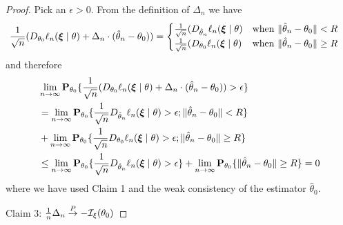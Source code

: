 \begin{proof}
Pick an $\epsilon > 0$.  From the definition of $\Delta_n$ we have
\begin{align*}
 \frac{1}{\sqrt{n}} (D_{\theta_0} \ell_n(\sample{\xi}
\mid \theta) + \Delta_n \cdot (\hat{\theta}_n - \theta_0))
&= \begin{cases}
 \frac{1}{\sqrt{n}} (D_{\hat{\theta}_n} \ell_n(\sample{\xi}
\mid \theta) & \text{when $\norm{\hat{\theta}_n -
  \theta_0} < R$} \\
 \frac{1}{\sqrt{n}} (D_{{\theta}_0} \ell_n(\sample{\xi}
\mid \theta) & \text{when $\norm{\hat{\theta}_n -
  \theta_0} \geq R$} \\
\end{cases}
\end{align*}
and therefore
\begin{align*}
&\lim_{n \to \infty} \sprobability{ \frac{1}{\sqrt{n}} (D_{\theta_0} \ell_n(\sample{\xi}
\mid \theta) + \Delta_n \cdot (\hat{\theta}_n - \theta_0)) >
\epsilon}{\theta_0} \\
&= 
\lim_{n \to \infty} \sprobability{  \frac{1}{\sqrt{n}} D_{\hat{\theta}_n} \ell_n(\sample{\xi}
\mid \theta) > \epsilon;\norm{\hat{\theta}_n -
  \theta_0} < R}{\theta_0} \\
&+ \lim_{n \to \infty}\sprobability{  \frac{1}{\sqrt{n}} D_{{\theta}_0} \ell_n(\sample{\xi}
\mid \theta) > \epsilon;\norm{\hat{\theta}_n -
  \theta_0} \geq R}{\theta_0} \\
&\leq 
\lim_{n \to \infty} \sprobability{ \frac{1}{\sqrt{n}} D_{\hat{\theta}_n} \ell_n(\sample{\xi}
\mid \theta) > \epsilon}{\theta_0} + \lim_{n \to \infty}\sprobability{\norm{\hat{\theta}_n -
  \theta_0} \geq R}{\theta_0} = 0
\end{align*}
where we have used Claim 1 and the weak consistency of the estimator
$\hat{\theta}_0$.

Claim 3: $\frac{1}{n}\Delta_n \toprob -\mathcal{I}_\xi(\theta_0)$


\end{proof}

